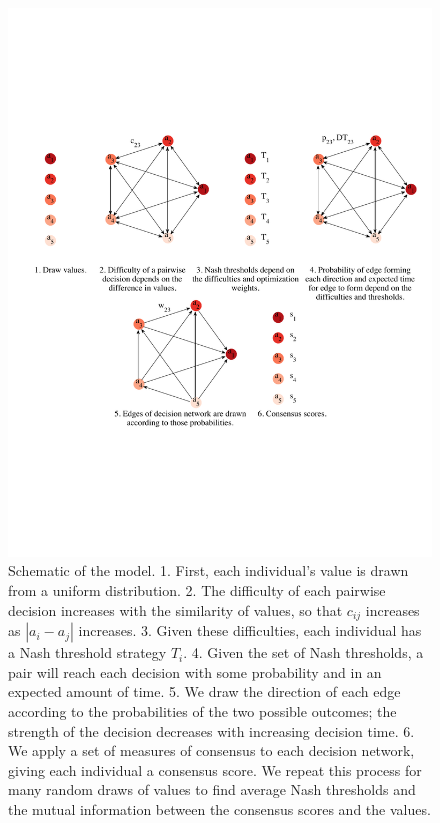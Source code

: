 \documentclass{article}
\begin{document}
\begin{figure}[bp]
\includegraphics[width=6.83in]{cartoon_cropped.pdf}
\caption{\label{cartoon} Schematic of the model. 1. First, each individual's value is drawn from a uniform distribution. 2. The difficulty of each pairwise decision increases with the similarity of values, so that $c_{ij}$ increases as $|a_i-a_j|$ increases. 3. Given these difficulties, each individual has a Nash threshold strategy $T_i$. 4. Given the set of Nash thresholds, a pair will reach each decision with some probability and in an expected amount of time. 5. We draw the direction of each edge according to the probabilities of the two possible outcomes; the strength of the decision decreases with increasing decision time. 6. We apply a set of measures of consensus to each decision network, giving each individual a consensus score. We repeat this process for many random draws of values to find average Nash thresholds and the mutual information between the consensus scores and the values. }
\end{figure}
\end{document}
